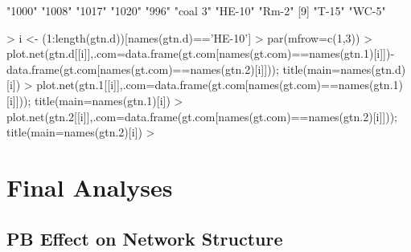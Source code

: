 \documentclass[12pt]{article}
\begin{document}
\begin{Schunk}
\begin{Soutput}
 [1] "1000"   "1008"   "1017"   "1020"   "996"    "coal 3" "HE-10"  "Rm-2"  
 [9] "T-15"   "WC-5"  
\end{Soutput}
\begin{Sinput}
> i <- (1:length(gtn.d))[names(gtn.d)=='HE-10']
> par(mfrow=c(1,3))
> plot.net(gtn.d[[i]],.com=data.frame(gt.com[names(gt.com)==names(gtn.1)[i]])-data.frame(gt.com[names(gt.com)==names(gtn.2)[i]]));  title(main=names(gtn.d)[i])
> plot.net(gtn.1[[i]],.com=data.frame(gt.com[names(gt.com)==names(gtn.1)[i]]));  title(main=names(gtn.1)[i])
> plot.net(gtn.2[[i]],.com=data.frame(gt.com[names(gt.com)==names(gtn.2)[i]]));  title(main=names(gtn.2)[i])
> 
\end{Sinput}
\end{Schunk}

\section{Final Analyses}

\subsection{PB Effect on Network Structure}
\end{document}
